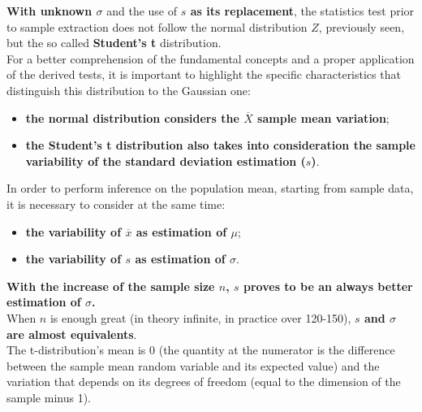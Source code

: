 \begin{frame}
  \textbf{With unknown {\boldmath $ \sigma $}} and the use of \textbf{{\boldmath $ s $} as its replacement}, the statistics test prior to sample extraction does not follow the normal distribution $ Z $, previously seen, but the so called \textbf{Student's t} distribution.\\
  \vspace*{.5cm}
  For a better comprehension of the fundamental concepts and a proper application of the derived tests, it is important to highlight the specific characteristics that distinguish this distribution to the Gaussian one:\\
  \begin{itemize}
    \item \textbf{the normal distribution considers the {\boldmath $ \overline{X} $} sample mean variation};
    \item \textbf{the Student's t distribution also takes into consideration the sample variability of the standard deviation estimation ({\boldmath $ s $})}.\\
  \end{itemize}
\end{frame}

\begin{frame}
  In order to perform inference on the population mean, starting from sample data, it is necessary to consider at the same time:\\
  \begin{itemize}
    \item \textbf{the variability of {\boldmath $ \overline{x} $} as estimation of {\boldmath $ \mu $}};
    \item \textbf{the variability of {\boldmath $ s $} as estimation of {\boldmath $ \sigma $}}.
  \end{itemize}
  \textbf{With the increase of the sample size {\boldmath $ n $}, {\boldmath $ s $} proves to be an always better estimation of {\boldmath $ \sigma $}.}\\
  \vspace*{.15cm}
  When {\boldmath $ n $} is enough great (in theory infinite, in practice over 120-150), \textbf{{\boldmath $ s $} and {\boldmath $ \sigma $} are almost equivalents}.\\
  \vspace*{.15cm}
  The t-distribution's mean  is 0 (the quantity at the numerator is the difference between the sample mean random variable and its expected value) and the variation that depends on its degrees of freedom (equal to the dimension of the sample minus 1).                                                                                                                                                                                                                                                     
\end{frame}

